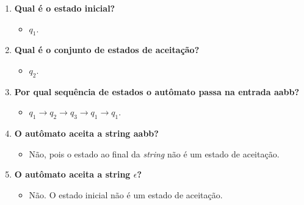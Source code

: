 \documentclass[a4paper, 12pt]{article}
\begin{document}
\begin{enumerate}
    \item \textbf{Qual é o estado inicial?}
    \begin{itemize}
        \item $q_1$.
    \end{itemize}
    
    
    \item \textbf{Qual é o conjunto de estados de aceitação?}
    \begin{itemize}
        \item ${q_2}$.
    \end{itemize}
    
    
    \item \textbf{Por qual sequência de estados o autômato passa na entrada aabb?}
    \begin{itemize}
        \item $q_1 \rightarrow q_2 \rightarrow q_3 \rightarrow q_1 \rightarrow q_1$.
    \end{itemize}
    
    
    \item \textbf{O autômato aceita a string aabb?}
    \begin{itemize}
        \item Não, pois o estado ao final da \textit{string} não é um estado
                de aceitação.
    \end{itemize}
    
    
    \item \textbf{O autômato aceita a string $\epsilon$?}
    \begin{itemize}
        \item Não. O estado inicial não é um estado de aceitação.
    \end{itemize}
\end{enumerate}
\end{document}
